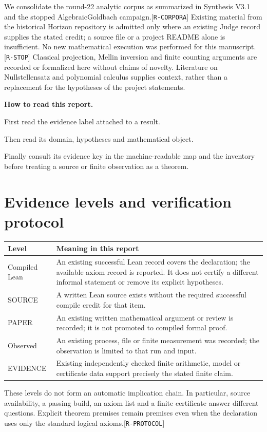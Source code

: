 \documentclass[11pt]{article}
\newcommand{\ev}[1]{{\scriptsize[\nolinkurl{#1}]}}
\theoremstyle{remark}
\begin{document}
We consolidate the round-22 analytic corpus as summarized in Synthesis V3.1
and the stopped AlgebraicGoldbach campaign.\ev{R-CORPORA}
Existing material from the historical Horizon repository is admitted only
where an existing Judge record supplies the stated credit; a source file or
a project README alone is insufficient. No new mathematical execution was
performed for this manuscript.\ev{R-STOP}
Classical projection, Mellin inversion and finite counting arguments are
recorded or formalized here without claims of novelty. Literature on
Nullstellensatz and polynomial calculus supplies context, rather than a
replacement for the hypotheses of the project statements.
\cite{ips1997,cei1996,bikpp1996,razborov1998,alon1999}

\noindent\textbf{How to read this report.}
\par First read the evidence label attached to a result.
\par Then read its domain, hypotheses and mathematical object.
\par Finally consult its evidence key in the machine-readable map and the
inventory before treating a source or finite observation as a theorem.

\section{Evidence levels and verification protocol}
\begin{center}\small
\begin{tabular}{p{2.3cm}p{12.6cm}}
\toprule
Level & Meaning in this report\\
\midrule
Compiled Lean & An existing successful Lean record covers the declaration;
the available axiom record is reported. It does not certify a different
informal statement or remove its explicit hypotheses.\\
SOURCE & A written Lean source exists without the required successful
compile credit for that item.\\
PAPER & An existing written mathematical argument or review is recorded;
it is not promoted to compiled formal proof.\\
Observed & An existing process, file or finite measurement was recorded;
the observation is limited to that run and input.\\
EVIDENCE & Existing independently checked finite arithmetic, model or
certificate data support precisely the stated finite claim.\\
\bottomrule
\end{tabular}
\end{center}
These levels do not form an automatic implication chain. In particular,
source availability, a passing build, an axiom list and a finite certificate
answer different questions. Explicit theorem premises remain premises even
when the declaration uses only the standard logical axioms.\ev{R-PROTOCOL}
\end{document}
